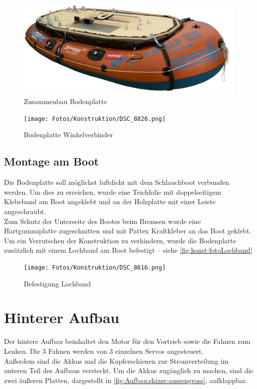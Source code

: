 \begin{figure}[H]
    \centering
    \includegraphics[width=.99\textwidth]{Fotos/Konstruktion/DSC_8622.png}
    \caption{Zusammenbau Bodenplatte \label{fig:konst:bodenplatte_zusammenbau}}    
\end{figure}
\begin{figure}[H]
    \centering
    \texttt{[image: Fotos/Konstruktion/DSC\_8826.png]}
    \caption{Bodenplatte Winkelverbinder\label{fig:konst:Winkelverbinder}}    
\end{figure}

\clearpage
\subsection{Montage am Boot}
Die Bodenplatte soll möglichst luftdicht mit dem Schlauchboot verbunden werden. Um dies zu erreichen, wurde eine Teichfolie mit doppelseitigem Klebeband am Boot angeklebt und an der Holzplatte mit einer Leiste angeschraubt.\\
Zum Schutz der Unterseite des Bootes beim Bremsen wurde eine Hartgummiplatte zugeschnitten und mit Pattex Kraftkleber an das Boot geklebt.\\
Um ein Verrutschen der Konstruktion zu verhindern, wurde die Bodenplatte zusätzlich mit einem Lochband am Boot befestigt -- siehe \autoref{fig:konst:fotoLochband}
\begin{figure}[H]
    \centering
    \texttt{[image: Fotos/Konstruktion/DSC\_8616.png]}
    \caption{Befestigung Lochband\label{fig:konst:fotoLochband}}    
\end{figure}
 

\clearpage
\section{Hinterer Aufbau}
Der hintere Aufbau beinhaltet den Motor für den Vortrieb sowie die Fahnen zum Lenken. Die 3 Fahnen werden von 3 einzelnen Servos angesteuert.\\ Außerdem sind die Akkus und die Kupferschienen zur Stromverteilung im unteren Teil des Aufbaus versteckt. Um die Akkus zugänglich zu machen, sind die zwei äußeren Platten, dargestellt in \autoref{fig:Aufbau:skizze:aussengross}, aufklappbar.

